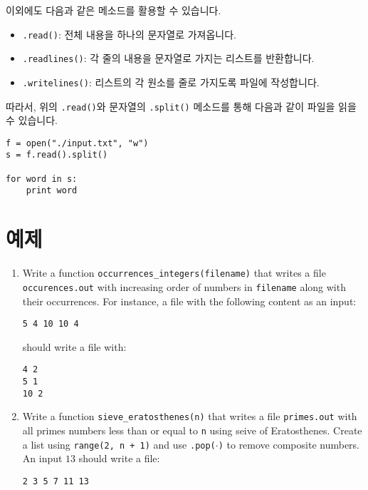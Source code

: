 \documentclass[../main.tex]{subfiles}
\begin{document}
이외에도 다음과 같은 메소드를 활용할 수 있습니다.
\begin{itemize}
    \item \texttt{.read()}: 전체 내용을 하나의 문자열로 가져옵니다.
    \item \texttt{.readlines()}: 각 줄의 내용을 문자열로 가지는 리스트를 반환합니다.
    \item \texttt{.writelines()}: 리스트의 각 원소를 줄로 가지도록 파일에 작성합니다.
\end{itemize}
따라서, 위의 \texttt{.read()}와 문자열의 \texttt{.split()} 메소드를 통해 다음과 같이 파일을 읽을 수 있습니다.
\begin{verbatim}
f = open("./input.txt", "w")
s = f.read().split()

for word in s:
    print word
\end{verbatim}


\section{예제}
\begin{enumerate}
\item Write a function \texttt{occurrences\_integers(filename)} that writes a file \texttt{occurences.out} with increasing order of numbers in \texttt{filename} along with their occurrences.
For instance, a file with the following content as an input:
\begin{verbatim}
5 4 10 10 4
\end{verbatim}
should write a file with:
\begin{verbatim}
4 2
5 1
10 2
\end{verbatim}

\item Write a function \texttt{sieve\_eratosthenes(n)} that writes a file \texttt{primes.out} with all primes numbers less than or equal to \texttt{n} using seive of Eratosthenes.
Create a list using \texttt{range(2, n + 1)} and use \texttt{.pop($\cdot$)} to remove composite numbers.
An input $13$ should write a file:
\begin{verbatim}
2 3 5 7 11 13
\end{verbatim}
\end{enumerate}
\end{document}
